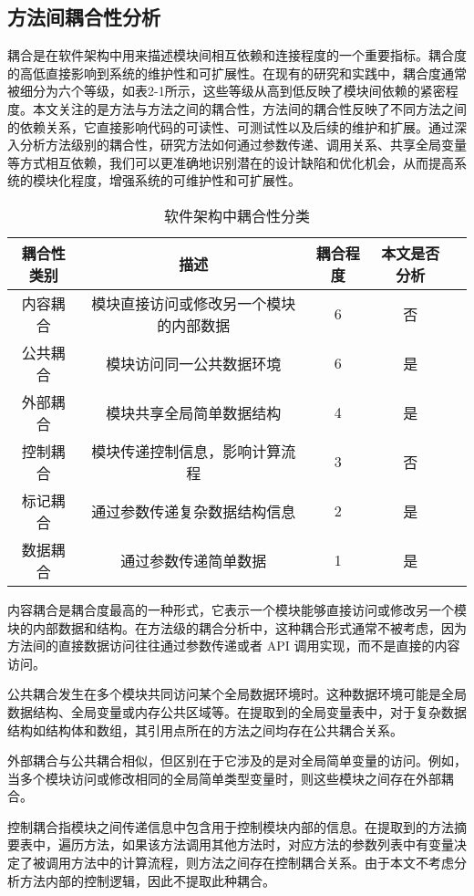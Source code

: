 \subsection{方法间耦合性分析}

耦合是在软件架构中用来描述模块间相互依赖和连接程度的一个重要指标。耦合度的高低直接影响到系统的维护性和可扩展性。在现有的研究和实践中，耦合度通常被细分为六个等级，如表2-1所示，这些等级从高到低反映了模块间依赖的紧密程度。本文关注的是方法与方法之间的耦合性，方法间的耦合性反映了不同方法之间的依赖关系，它直接影响代码的可读性、可测试性以及后续的维护和扩展。通过深入分析方法级别的耦合性，研究方法如何通过参数传递、调用关系、共享全局变量等方式相互依赖，我们可以更准确地识别潜在的设计缺陷和优化机会，从而提高系统的模块化程度，增强系统的可维护性和可扩展性。

\begin{table}[htbp]
\caption{软件架构中耦合性分类}
\vspace{0.5em}\centering\wuhao
\begin{tabular}{ccccc}
\toprule
耦合性类别 & 描述 & 耦合程度 & 本文是否分析 \\
\midrule
内容耦合 & 模块直接访问或修改另一个模块的内部数据 & 6 & 否\\
公共耦合 & 模块访问同一公共数据环境 & 6 & 是 \\
外部耦合 & 模块共享全局简单数据结构 & 4 & 是 \\
控制耦合 & 模块传递控制信息，影响计算流程 & 3 & 否 \\
标记耦合 & 通过参数传递复杂数据结构信息 & 2 & 是 \\
数据耦合 & 通过参数传递简单数据 & 1 & 是 \\
\bottomrule
\end{tabular}
\end{table}


内容耦合是耦合度最高的一种形式，它表示一个模块能够直接访问或修改另一个模块的内部数据和结构。在方法级的耦合分析中，这种耦合形式通常不被考虑，因为方法间的直接数据访问往往通过参数传递或者 API 调用实现，而不是直接的内容访问。

公共耦合发生在多个模块共同访问某个全局数据环境时。这种数据环境可能是全局数据结构、全局变量或内存公共区域等。在提取到的全局变量表中，对于复杂数据结构如结构体和数组，其引用点所在的方法之间均存在公共耦合关系。


外部耦合与公共耦合相似，但区别在于它涉及的是对全局简单变量的访问。例如，当多个模块访问或修改相同的全局简单类型变量时，则这些模块之间存在外部耦合。


控制耦合指模块之间传递信息中包含用于控制模块内部的信息。在提取到的方法摘
要表中，遍历方法，如果该方法调用其他方法时，对应方法的参数列表中有变量决定了被调用方法中的计算流程，则方法之间存在控制耦合关系。由于本文不考虑分析方法内部的控制逻辑，因此不提取此种耦合。


